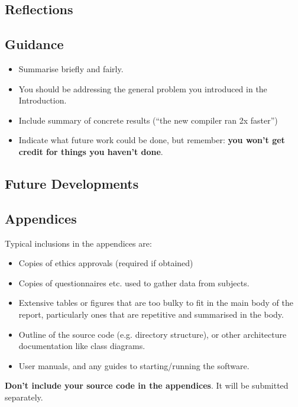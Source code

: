 \documentclass{l4proj}
\begin{document}
\section{Reflections}
\section{Guidance}
\begin{itemize}
    \item
        Summarise briefly and fairly.
    \item
        You should be addressing the general problem you introduced in the
        Introduction.        
    \item
        Include summary of concrete results (``the new compiler ran 2x
        faster'')
    \item
        Indicate what future work could be done, but remember: \textbf{you
        won't get credit for things you haven't done}.
\end{itemize}


\section{Future Developments}

%
% 

\begin{appendices}

\chapter{Appendices}

Typical inclusions in the appendices are:

\begin{itemize}
\item
  Copies of ethics approvals (required if obtained)
\item
  Copies of questionnaires etc. used to gather data from subjects.
\item
  Extensive tables or figures that are too bulky to fit in the main body of
  the report, particularly ones that are repetitive and summarised in the body.

\item Outline of the source code (e.g. directory structure), or other architecture documentation like class diagrams.

\item User manuals, and any guides to starting/running the software.

\end{itemize}

\textbf{Don't include your source code in the appendices}. It will be
submitted separately.

\end{appendices}
\end{document}
